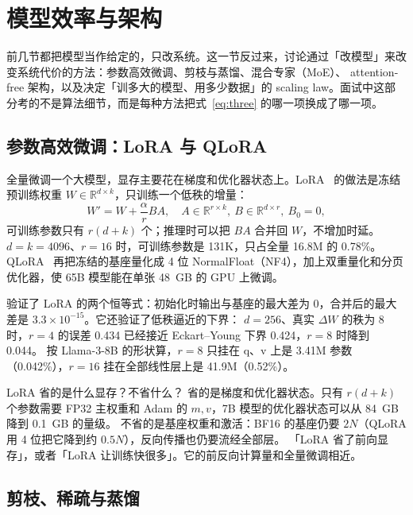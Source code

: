\section{模型效率与架构}
\label{sec:eff}

前几节都把模型当作给定的，只改系统。这一节反过来，讨论通过「改模型」来改变系统代价的方法：参数高效微调、剪枝与蒸馏、混合专家（MoE）、
attention-free 架构，以及决定「训多大的模型、用多少数据」的 scaling law。面试中这部分考的不是算法细节，而是每种方法把式~\eqref{eq:three} 的哪一项换成了哪一项。

\subsection{参数高效微调：LoRA 与 QLoRA}

全量微调一个大模型，显存主要花在梯度和优化器状态上。LoRA~\cite{hu2022lora} 的做法是冻结预训练权重 $W\in\mathbb{R}^{d\times k}$，只训练一个低秩的增量：
\begin{equation}
W' = W + \frac{\alpha}{r}BA,\quad A\in\mathbb{R}^{r\times k},\ B\in\mathbb{R}^{d\times r},\ B_0=0,
\end{equation}
可训练参数只有 $r(d+k)$ 个；推理时可以把 $BA$ 合并回 $W$，不增加时延。$d=k=4096$、$r=16$ 时，可训练参数是 131K，只占全量 16.8M 的 0.78\%。
QLoRA~\cite{dettmers2023qlora} 再把冻结的基座量化成 4 位 NormalFloat（NF4），加上双重量化和分页优化器，使 65B 模型能在单张 48~GB 的 GPU 上微调。

验证了 LoRA 的两个恒等式：初始化时输出与基座的最大差为 0，合并后的最大差是 $3.3\times10^{-15}$。它还验证了低秩逼近的下界：
$d=256$、真实 $\Delta W$ 的秩为 8 时，$r=4$ 的误差 0.434 已经接近 Eckart--Young 下界 0.424，$r=8$ 时降到 0.044。
按 Llama-3-8B 的形状算，$r=8$ 只挂在 q、v 上是 3.41M 参数（0.042\%），$r=16$ 挂在全部线性层上是 41.9M（0.52\%）。

\begin{qa}{LoRA 省的是什么显存？不省什么？}
\ans 省的是梯度和优化器状态。只有 $r(d+k)$ 个参数需要 FP32 主权重和 Adam 的 $m,v$，7B 模型的优化器状态可以从 84~GB 降到 0.1~GB 的量级。
不省的是基座权重和激活：BF16 的基座仍要 $2N$（QLoRA 用 4 位把它降到约 $0.5N$），反向传播也仍要流经全部层。
\wrong 「LoRA 省了前向显存」，或者「LoRA 让训练快很多」。它的前反向计算量和全量微调相近。
\end{qa}

\subsection{剪枝、稀疏与蒸馏}

